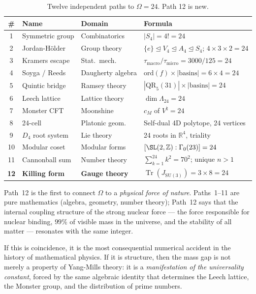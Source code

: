 \documentclass[11pt,a4paper]{article}
\theoremstyle{plain}
\theoremstyle{remark}
\renewcommand{\Omega}{\varOmega}
\newcommand{\Z}{\mathbb{Z}}
\newcommand{\R}{\mathbb{R}}
\newcommand{\Tr}{\operatorname{Tr}}
\newcommand{\SU}{\mathrm{SU}}
\begin{document}
\begin{table}[H]
\centering
\caption{Twelve independent paths to $\Omega = 24$.  Path 12 is new.}
\label{tab:twelve-paths}
\smallskip
\begin{tabular}{clll}
\toprule
\# & Name & Domain & Formula \\
\midrule
1 & Symmetric group & Combinatorics & $|S_4| = 4! = 24$ \\
2 & Jordan-H\"older & Group theory & $\{e\} \trianglelefteq V_4 \trianglelefteq A_4 \trianglelefteq S_4$; $4 \times 3 \times 2 = 24$ \\
3 & Kramers escape & Stat.\ mech.\ & $\tau_{\mathrm{macro}}/\tau_{\mathrm{micro}} = 3000/125 = 24$ \\
4 & Soyga / Reeds & Daugherty algebra & $\mathrm{ord}(f) \times |\mathrm{basins}| = 6 \times 4 = 24$ \\
5 & Quintic bridge & Ramsey theory & $|\mathrm{QR}_5(31)| \times |\mathrm{basins}| = 24$ \\
6 & Leech lattice & Lattice theory & $\dim \Lambda_{24} = 24$ \\
7 & Monster CFT & Moonshine & $c_M$ of $V^\natural = 24$ \\
8 & 24-cell & Platonic geom.\ & Self-dual 4D polytope, 24 vertices \\
9 & $D_4$ root system & Lie theory & 24 roots in $\R^4$, triality \\
10 & Modular coset & Modular forms & $[\SL(2,\Z) : \Gamma_0(23)] = 24$ \\
11 & Cannonball sum & Number theory & $\sum_{k=1}^{24} k^2 = 70^2$; unique $n > 1$ \\
\rowcolor{lightaccent}
\textbf{12} & \textbf{Killing form} & \textbf{Gauge theory} & $\Tr(J_{\SU(3)}) = 3 \times 8 = 24$ \\
\bottomrule
\end{tabular}
\end{table}

Path~12 is the first to connect $\Omega$ to a \emph{physical force of
nature}.  Paths~1--11 are pure mathematics (algebra, geometry, number
theory); Path~12 says that the internal coupling structure of the strong
nuclear force --- the force responsible for nuclear binding, $99\%$ of
visible mass in the universe, and the stability of all matter ---
resonates with the same integer.

If this is coincidence, it is the most consequential numerical accident
in the history of mathematical physics.  If it is structure, then the
mass gap is not merely a property of Yang-Mills theory: it is a
\emph{manifestation of the universality constant}, forced by the same
algebraic identity that determines the Leech lattice, the Monster group,
and the distribution of prime numbers.
\end{document}
